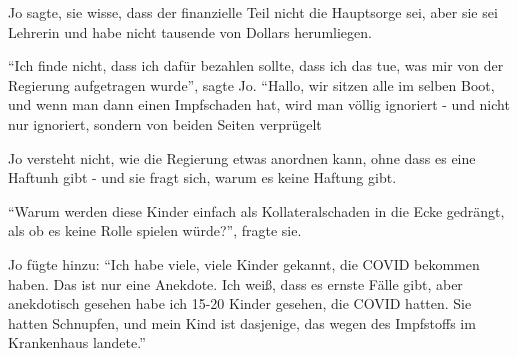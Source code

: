 {Jo sagte, sie wisse, dass der finanzielle Teil nicht die Hauptsorge sei, aber
sie sei Lehrerin und habe nicht tausende von Dollars herumliegen.

``Ich finde nicht, dass ich dafür bezahlen sollte, dass ich das tue, was mir von
der Regierung aufgetragen wurde'', sagte Jo. ``Hallo, wir sitzen alle im selben
Boot, und wenn man dann einen Impfschaden hat, wird man völlig ignoriert - und
nicht nur ignoriert, sondern von beiden Seiten verprügelt

Jo versteht nicht, wie die Regierung etwas anordnen kann, ohne dass es eine
Haftunh gibt - und sie fragt sich, warum es keine Haftung gibt.

``Warum werden diese Kinder einfach als Kollateralschaden in die Ecke gedrängt,
als ob es keine Rolle spielen würde?'', fragte sie.

Jo fügte hinzu: ``Ich habe viele, viele Kinder gekannt, die COVID bekommen
haben. Das ist nur eine Anekdote. Ich weiß, dass es ernste Fälle gibt, aber
anekdotisch gesehen habe ich 15-20 Kinder gesehen, die COVID hatten. Sie hatten
Schnupfen, und mein Kind ist dasjenige, das wegen des Impfstoffs im Krankenhaus
landete.''

}

